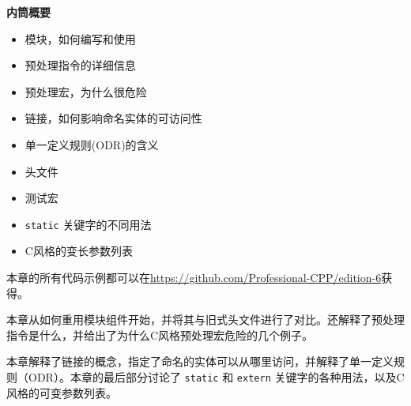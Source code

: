 \noindent
\textbf{内筒概要}

\begin{itemize}
\item
模块，如何编写和使用

\item
预处理指令的详细信息

\item
预处理宏，为什么很危险

\item
链接，如何影响命名实体的可访问性

\item
单一定义规则(ODR)的含义

\item
头文件

\item
测试宏

\item
\verb|static| 关键字的不同用法

\item
C风格的变长参数列表
\end{itemize}

本章的所有代码示例都可以在\url{https://github.com/Professional-CPP/edition-6}获得。

本章从如何重用模块组件开始，并将其与旧式头文件进行了对比。还解释了预处理指令是什么，并给出了为什么C风格预处理宏危险的几个例子。

本章解释了链接的概念，指定了命名的实体可以从哪里访问，并解释了单一定义规则（ODR）。本章的最后部分讨论了 \verb|static| 和 \verb|extern| 关键字的各种用法，以及C风格的可变参数列表。































